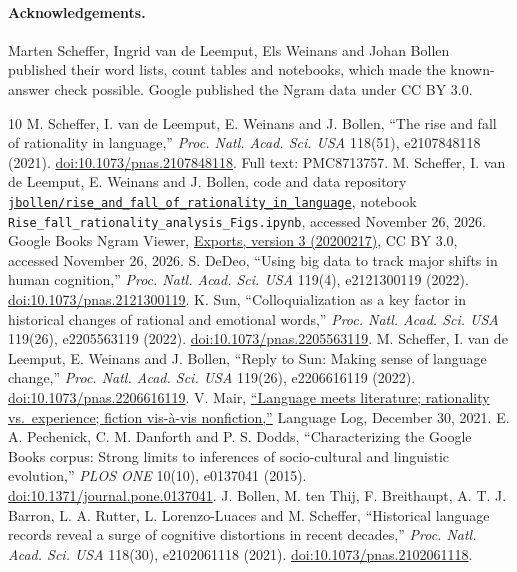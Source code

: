 \documentclass[11pt]{article}
\begin{document}
\paragraph{Acknowledgements.} Marten Scheffer, Ingrid van de Leemput, Els Weinans and Johan Bollen published their word lists, count tables and notebooks, which made the known-answer check possible. Google published the Ngram data under CC BY 3.0.

\begin{thebibliography}{10}
 M. Scheffer, I. van de Leemput, E. Weinans and J. Bollen, ``The rise and fall of rationality in language,'' \emph{Proc. Natl. Acad. Sci. USA} 118(51), e2107848118 (2021). \href{https://doi.org/10.1073/pnas.2107848118}{doi:10.1073/pnas.2107848118}. Full text: PMC8713757.
 M. Scheffer, I. van de Leemput, E. Weinans and J. Bollen, code and data repository \href{https://github.com/jbollen/rise_and_fall_of_rationality_in_language}{\texttt{jbollen/rise\_and\_fall\_of\_rationality\_in\_language}}, notebook \texttt{Rise\_fall\_rationality\_analysis\_Figs.ipynb}, accessed November 26, 2026.
 Google Books Ngram Viewer, \href{https://storage.googleapis.com/books/ngrams/books/datasetsv3.html}{Exports, version 3 (20200217)}, CC BY 3.0, accessed November 26, 2026.
 S. DeDeo, ``Using big data to track major shifts in human cognition,'' \emph{Proc. Natl. Acad. Sci. USA} 119(4), e2121300119 (2022). \href{https://doi.org/10.1073/pnas.2121300119}{doi:10.1073/pnas.2121300119}.
 K. Sun, ``Colloquialization as a key factor in historical changes of rational and emotional words,'' \emph{Proc. Natl. Acad. Sci. USA} 119(26), e2205563119 (2022). \href{https://doi.org/10.1073/pnas.2205563119}{doi:10.1073/pnas.2205563119}.
 M. Scheffer, I. van de Leemput, E. Weinans and J. Bollen, ``Reply to Sun: Making sense of language change,'' \emph{Proc. Natl. Acad. Sci. USA} 119(26), e2206616119 (2022). \href{https://doi.org/10.1073/pnas.2206616119}{doi:10.1073/pnas.2206616119}.
 V. Mair, \href{https://languagelog.ldc.upenn.edu/nll/?p=53178}{``Language meets literature; rationality vs.\ experience; fiction vis-\`a-vis nonfiction,''} Language Log, December 30, 2021.
 E. A. Pechenick, C. M. Danforth and P. S. Dodds, ``Characterizing the Google Books corpus: Strong limits to inferences of socio-cultural and linguistic evolution,'' \emph{PLOS ONE} 10(10), e0137041 (2015). \href{https://doi.org/10.1371/journal.pone.0137041}{doi:10.1371/journal.pone.0137041}.
 J. Bollen, M. ten Thij, F. Breithaupt, A. T. J. Barron, L. A. Rutter, L. Lorenzo-Luaces and M. Scheffer, ``Historical language records reveal a surge of cognitive distortions in recent decades,'' \emph{Proc. Natl. Acad. Sci. USA} 118(30), e2102061118 (2021). \href{https://doi.org/10.1073/pnas.2102061118}{doi:10.1073/pnas.2102061118}.

\end{thebibliography}
\end{document}
